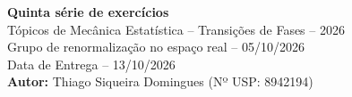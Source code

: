 \documentclass[12pt,a4paper]{article}
\begin{document}

\begin{center}
    {\Large \textbf{Quinta série de exercícios}}\\[0.6cm]
    {\large Tópicos de Mecânica Estatística -- Transições de Fases -- 2026}\\[0.2cm]
    {\large Grupo de renormalização no espaço real -- 05/10/2026}\\[0.2cm]
    {\large Data de Entrega -- 13/10/2026}\\[0.2cm]
    {\Large \textbf{Autor:} Thiago Siqueira Domingues (Nº USP: 8942194)}
\end{center}
%
\vspace{0.4cm}
\end{document}
